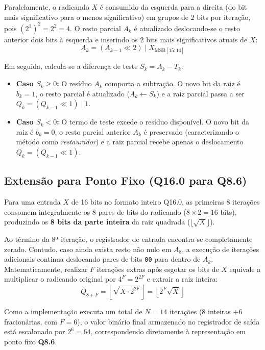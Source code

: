 \documentclass[conference]{IEEEtran}
\begin{document}
Paralelamente, o radicando $X$ é consumido da esquerda para a direita (do bit mais significativo para o menos significativo) em grupos de 2 bits por iteração, pois $(2^1)^2 = 2^2 = 4$. O resto parcial $A_k$ é atualizado deslocando-se o resto anterior dois bits à esquerda e inserindo os 2 bits mais significativos atuais de $X$:
\begin{equation}
	A_k = (A_{k-1} \ll 2) \mid X_{\text{MSB}[15:14]}
	\label{eq:resto}
\end{equation}

Em seguida, calcula-se a diferença de teste $S_k = A_k - T_k$:
\begin{itemize}
	\item \textbf{Caso $S_k \ge 0$:} O resíduo $A_k$ comporta a subtração. O novo bit da raiz é $b_k = 1$, o resto parcial é atualizado ($A_k \leftarrow S_k$) e a raiz parcial passa a ser $Q_k = (Q_{k-1} \ll 1) \mid 1$.
	\item \textbf{Caso $S_k < 0$:} O termo de teste excede o resíduo disponível. O novo bit da raiz é $b_k = 0$, o resto parcial anterior $A_k$ é preservado (caracterizando o método como \textit{restaurador}) e a raiz parcial recebe apenas o deslocamento $Q_k = (Q_{k-1} \ll 1)$.
\end{itemize}

\subsection{Extensão para Ponto Fixo (Q16.0 para Q8.6)}
Para uma entrada $X$ de 16 bits no formato inteiro Q16.0, as primeiras $8$ iterações consomem integralmente os $8$ pares de bits do radicando ($8 \times 2 = 16$ bits), produzindo os \textbf{8 bits da parte inteira} da raiz quadrada ($\lfloor\sqrt{X}\rfloor$).

Ao término da 8ª iteração, o registrador de entrada encontra-se completamente zerado. Contudo, caso ainda exista resto não nulo em $A_8$, a execução de iterações adicionais continua deslocando pares de bits \texttt{00} para dentro de $A_k$. Matematicamente, realizar $F$ iterações extras após esgotar os bits de $X$ equivale a multiplicar o radicando original por $4^F = 2^{2F}$ e extrair a raiz inteira:
\begin{equation}
	Q_{8+F} = \left\lfloor \sqrt{X \cdot 2^{2F}} \right\rfloor = \left\lfloor 2^F \sqrt{X} \right\rfloor
	\label{eq:escala}
\end{equation}

Como a implementação executa um total de $N = 14$ iterações ($8$ inteiras $+ 6$ fracionárias, com $F = 6$), o valor binário final armazenado no registrador de saída está escalonado por $2^6 = 64$, correspondendo diretamente à representação em ponto fixo \textbf{Q8.6}.
\end{document}
